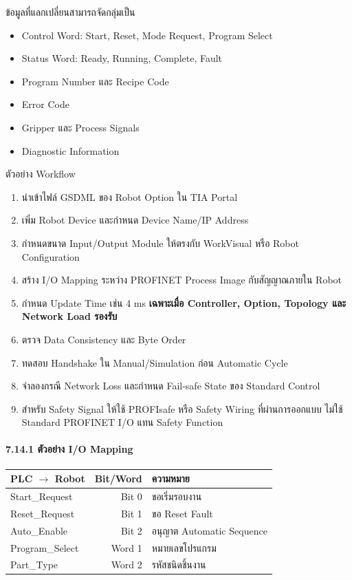 ข้อมูลที่แลกเปลี่ยนสามารถจัดกลุ่มเป็น

\begin{itemize}
    \item Control Word: Start, Reset, Mode Request, Program Select
    \item Status Word: Ready, Running, Complete, Fault
    \item Program Number และ Recipe Code
    \item Error Code
    \item Gripper และ Process Signals
    \item Diagnostic Information
\end{itemize}

ตัวอย่าง Workflow

\begin{enumerate}
    \item นำเข้าไฟล์ GSDML ของ Robot Option ใน TIA Portal
    \item เพิ่ม Robot Device และกำหนด Device Name/IP Address
    \item กำหนดขนาด Input/Output Module ให้ตรงกับ WorkVisual หรือ Robot Configuration
    \item สร้าง I/O Mapping ระหว่าง PROFINET Process Image กับสัญญาณภายใน Robot
    \item กำหนด Update Time เช่น 4 ms \textbf{เฉพาะเมื่อ Controller, Option, Topology และ Network Load รองรับ}
    \item ตรวจ Data Consistency และ Byte Order
    \item ทดสอบ Handshake ใน Manual/Simulation ก่อน Automatic Cycle
    \item จำลองกรณี Network Loss และกำหนด Fail-safe State ของ Standard Control
    \item สำหรับ Safety Signal ให้ใช้ PROFIsafe หรือ Safety Wiring ที่ผ่านการออกแบบ ไม่ใช้ Standard PROFINET I/O แทน Safety Function
\end{enumerate}

\paragraph{7.14.1 ตัวอย่าง I/O Mapping}

\begin{table}[htbp]
    \centering
    \begin{tabular}{l r l}
        \hline
        \textbf{PLC \(\to\) Robot} & \textbf{Bit/Word} & \textbf{ความหมาย} \\
        \hline
        Start\_Request & Bit 0 & ขอเริ่มรอบงาน \\
        Reset\_Request & Bit 1 & ขอ Reset Fault \\
        Auto\_Enable & Bit 2 & อนุญาต Automatic Sequence \\
        Program\_Select & Word 1 & หมายเลขโปรแกรม \\
        Part\_Type & Word 2 & รหัสชนิดชิ้นงาน \\
        \hline
    \end{tabular}
\end{table}

